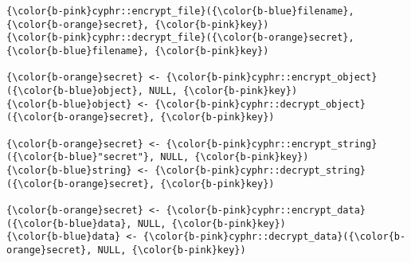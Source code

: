 \documentclass[class=minimal,border=0]{standalone}
\begin{document}
%
\begin{BVerbatim}[bgcolor=b-darkgrey]
{\color{b-pink}cyphr::encrypt_file}({\color{b-blue}filename}, {\color{b-orange}secret}, {\color{b-pink}key})
{\color{b-pink}cyphr::decrypt_file}({\color{b-orange}secret}, {\color{b-blue}filename}, {\color{b-pink}key})

{\color{b-orange}secret} <- {\color{b-pink}cyphr::encrypt_object}({\color{b-blue}object}, NULL, {\color{b-pink}key})
{\color{b-blue}object} <- {\color{b-pink}cyphr::decrypt_object}({\color{b-orange}secret}, {\color{b-pink}key})

{\color{b-orange}secret} <- {\color{b-pink}cyphr::encrypt_string}({\color{b-blue}"secret"}, NULL, {\color{b-pink}key})
{\color{b-blue}string} <- {\color{b-pink}cyphr::decrypt_string}({\color{b-orange}secret}, {\color{b-pink}key})

{\color{b-orange}secret} <- {\color{b-pink}cyphr::encrypt_data}({\color{b-blue}data}, NULL, {\color{b-pink}key})
{\color{b-blue}data} <- {\color{b-pink}cyphr::decrypt_data}({\color{b-orange}secret}, NULL, {\color{b-pink}key})
\end{BVerbatim}
\end{document}
